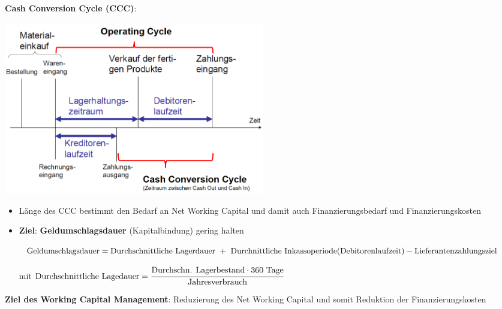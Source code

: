\textbf{Cash Conversion Cycle (CCC)}:
\begin{center}
	\includegraphics[width=0.5\textwidth]{images/ccc.png}
\end{center}
\begin{itemize}
	\item Länge des CCC bestimmt den Bedarf an Net Working Capital und damit auch Finanzierungsbedarf und Finanzierungskosten
	\item \textbf{Ziel}: \textbf{Geldumschlagsdauer} (Kapitalbindung) gering halten
	
	$\text{Geldumschlagsdauer}=\text{Durchschnittliche Lagerdauer } + \text{ Durchnittliche Inkassoperiode} \newline \text{(Debitorenlaufzeit)}-\text{Lieferantenzahlungsziel}$
	
	mit $\text{Durchschnittliche Lagedauer}=\cfrac{\text{Durchschn. Lagerbestand} \cdot 360 \text{ Tage}}{\text{Jahresverbrauch}}$
\end{itemize}
\bigskip
\textbf{Ziel des Working Capital Management}: Reduzierung des Net Working Capital und somit Reduktion der Finanzierungskosten


